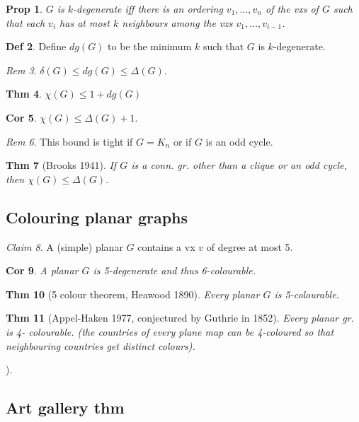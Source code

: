 \documentclass[11pt, fleqn, a4paper, landscape]{article}
\theoremstyle{plain} %
\newtheorem{thm}{Thm}
\newtheorem{pro}[thm]{Prop}
\newtheorem{cor}[thm]{Cor}
\theoremstyle{remark} %
\newtheorem{rem}[thm]{Rem}
\newtheorem{claim}[thm]{Claim}
\theoremstyle{definition} %
\newtheorem{defi}[thm]{Def}
\begin{document}
\begin{multicols}{5}
\begin{pro}
$G$ is $k$-degenerate iff there is an ordering $v_1, \dots , v_n$ of the vxs of $G$ such that each $v_i$ has at most $k$ neighbours among the vxs $v_1, \dots , v_{i-1}$.
\end{pro}

\begin{defi}
Define $dg(G)$ to be the minimum $k$ such that $G$ is $k$-degenerate.
\end{defi}
\begin{rem}
$\delta(G) \le dg(G) \le \Delta(G)$.
\end{rem}

\begin{thm}
$\chi(G) \le 1 + dg(G)$
\end{thm}

\begin{cor}
$\chi(G) \le \Delta(G) + 1.$
\end{cor}

\begin{rem}
This bound is tight if $G = K_n$ or if $G$ is an odd cycle.
\end{rem}

\begin{thm}[Brooks 1941]
If $G$ is a conn. gr. other than a clique or an odd cycle, then
$\chi(G) \le \Delta(G).$
\end{thm}

\subsection{Colouring planar graphs}
\begin{claim}
A (simple) planar $G$ contains a vx $v$ of degree at most 5.
\end{claim}

\begin{cor}
A planar $G$ is 5-degenerate and thus 6-colourable.
\end{cor}
\begin{thm}[5 colour theorem, Heawood 1890]
Every planar $G$ is 5-colourable.
\end{thm}

\begin{thm}[Appel-Haken 1977, conjectured by Guthrie in 1852]
Every planar gr. is 4-
colourable. (the countries of every plane map can be 4-coloured so that neighbouring countries get
distinct colours).
\end{thm}). 
\addtocounter{thm}{1}
\subsection{Art gallery thm}


\end{multicols}
\end{document}
